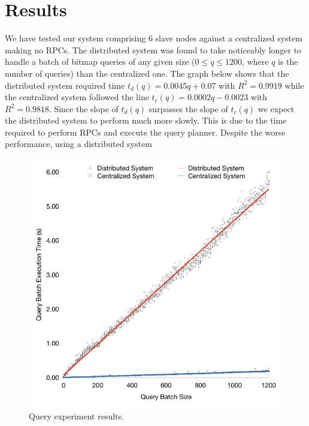 \section{Results}
We have tested our system comprising 6 slave nodes against a centralized system making no RPCs.
The distributed system was found to take noticeably longer to handle a batch of bitmap queries of any given size
(\(0 \leq q \leq 1200\), where \(q\) is the number of queries) than the centralized one.
The graph below shows that the distributed system required time \(t_d(q) = 0.0045q + 0.07\) with \(R^2 = 0.9919\)
while the centralized system followed the line \(t_c(q) = 0.0002q - 0.0023\) with \(R^2 = 0.9818\).
Since the slope of \(t_d(q)\) surpasses the slope of \(t_c(q)\) we expect the distributed system to perform much more slowly.
This is due to the time required to perform RPCs and execute the query planner.
Despite the worse performance, using a distributed system
\begin{figure}
\centering
\includegraphics[width=\columnwidth]{query-experiment-results}
\caption{Query experiment results.}
\end{figure}
